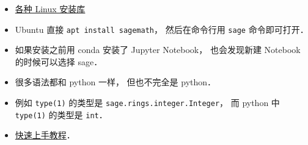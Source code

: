 
\begin{issues}
\issueDraft
\end{issues}

\begin{itemize}
\item \href{https://repology.org/project/sagemath/versions}{各种 Linux 安装库}
\item Ubuntu 直接 \verb|apt install sagemath|， 然后在命令行用 \verb|sage| 命令即可打开．
\item 如果安装之前用 conda 安装了 Jupyter Notebook， 也会发现新建 Notebook 的时候可以选择 sage．
\item 很多语法都和 python 一样， 但也不完全是 python．
\item 例如 \verb|type(1)| 的类型是 \verb|sage.rings.integer.Integer|， 而 python 中 \verb|type(1)| 的类型是 \verb|int|．
\item \href{https://www.sagemath.org/tour-quickstart.html}{快速上手教程}．
\end{itemize}
